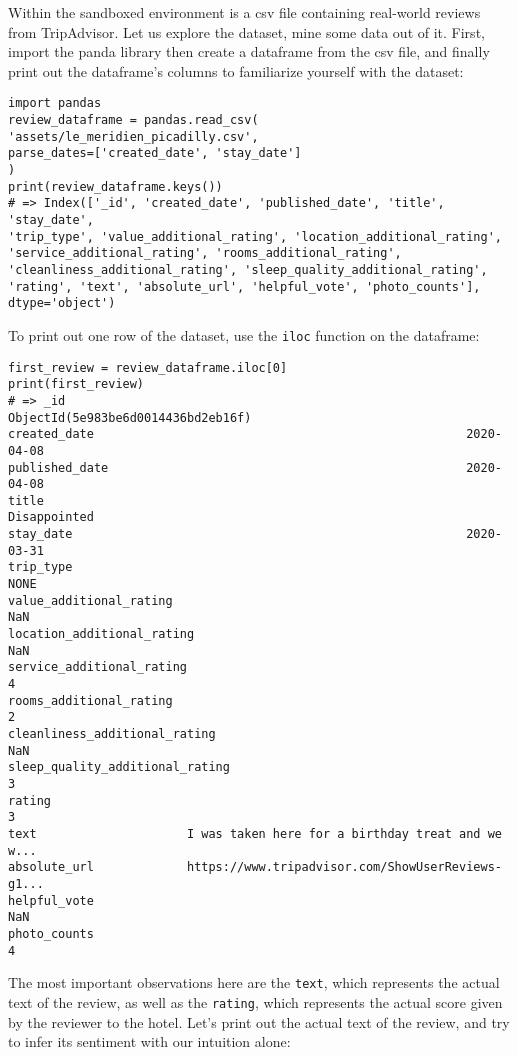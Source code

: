 	Within the sandboxed environment is a csv file containing real-world reviews from TripAdvisor. Let us explore the dataset, mine some data out of it. First, import the panda library then create a dataframe from the csv file, and finally print out the dataframe's columns to familiarize yourself with the dataset:
	\begin{Verbatim}
import pandas
review_dataframe = pandas.read_csv(
'assets/le_meridien_picadilly.csv', 
parse_dates=['created_date', 'stay_date']
)
print(review_dataframe.keys())
# => Index(['_id', 'created_date', 'published_date', 'title', 'stay_date',
'trip_type', 'value_additional_rating', 'location_additional_rating',
'service_additional_rating', 'rooms_additional_rating',
'cleanliness_additional_rating', 'sleep_quality_additional_rating',
'rating', 'text', 'absolute_url', 'helpful_vote', 'photo_counts'],
dtype='object')
	\end{Verbatim}
	To print out one row of the dataset, use the \verb|iloc| function on the dataframe:
	\begin{Verbatim}
first_review = review_dataframe.iloc[0]
print(first_review)
# => _id                                     ObjectId(5e983be6d0014436bd2eb16f)
created_date                                                    2020-04-08
published_date                                                  2020-04-08
title                                                         Disappointed
stay_date                                                       2020-03-31
trip_type                                                             NONE
value_additional_rating                                                NaN
location_additional_rating                                             NaN
service_additional_rating                                                4
rooms_additional_rating                                                  2
cleanliness_additional_rating                                          NaN
sleep_quality_additional_rating                                          3
rating                                                                   3
text                     I was taken here for a birthday treat and we w...
absolute_url             https://www.tripadvisor.com/ShowUserReviews-g1...
helpful_vote                                                           NaN
photo_counts                                                             4
	\end{Verbatim}
	The most important observations here are the \verb|text|, which represents the actual text of the review, as well as the \verb|rating|, which represents the actual score given by the reviewer to the hotel. Let's print out the actual text of the review, and try to infer its sentiment with our intuition alone:

